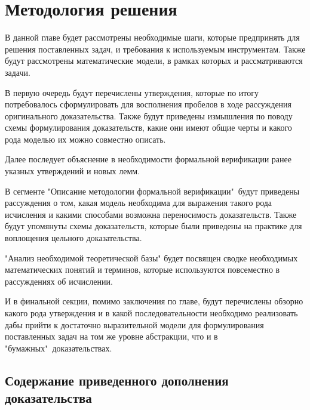 \documentclass[times,specification,annotation]{itmo-student-thesis}
\begin{document}

\chapter{Методология решения}

В данной главе будет рассмотрены необходимые шаги, которые предпринять для решения поставленных задач, и требования к используемым инструментам. Также будут рассмотрены математические модели, в рамках которых и рассматриваются задачи.  

В первую очередь будут перечислены утверждения, которые по итогу потребовалось сформулировать для восполнения пробелов в ходе рассуждения оригинального доказательства. Также будут приведены измышления по поводу схемы формулирования доказательств, какие они имеют общие черты и какого рода моделью их можно совместно описать.

Далее последует объяснение в необходимости формальной верификации ранее указных утверждений и новых лемм.

В сегменте "Описание методологии формальной верификации"\ будут приведены рассуждения о том, какая модель необходима для выражения такого рода исчисления и какими способами возможна переносимость доказательств. Также будут упомянуты схемы доказательств, которые были приведены на практике для воплощения цельного доказательства.

"Анализ необходимой теоретической базы" будет посвящен сводке необходимых математических понятий и терминов, которые используются повсеместно в рассуждениях об исчислении.

И в финальной секции, помимо заключения по главе, будут перечислены обзорно какого рода утверждения и в какой последовательности необходимо реализовать дабы прийти к достаточно выразительной модели для формулирования поставленных задач на том же уровне абстракции, что и в "бумажных"\ доказательствах.

\todo
\section{Содержание приведенного дополнения доказательства}
\todo
\end{document}
